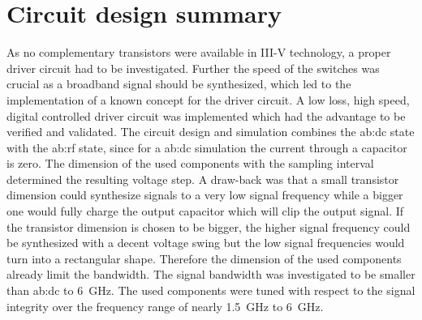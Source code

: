 \section{Circuit design summary}
As no complementary transistors were available in III-V technology, a proper driver circuit had to be investigated.
Further the speed of the switches was crucial as a broadband signal should be synthesized, which led to the implementation of a known concept \cite{MaksimovicPaper} for the driver circuit.
A low loss, high speed, digital controlled driver circuit was implemented which had the advantage to be verified and validated.
The circuit design and simulation combines the \gls{ab:dc} state with the \gls{ab:rf} state, since for a \gls{ab:dc} simulation the current through a capacitor is zero.
The dimension of the used components with the sampling interval determined the resulting voltage step.
A draw-back was that a small transistor dimension could synthesize signals to a very low signal frequency while a bigger one would fully charge the output capacitor which will clip the output signal.
If the transistor dimension is chosen to be bigger, the higher signal frequency could be synthesized with a decent voltage swing but the low signal frequencies would turn into a rectangular shape. 
Therefore the dimension of the used components already limit the bandwidth.
The signal bandwidth was investigated to be smaller than \gls{ab:dc} to \SI{6}{\GHz}.
The used components were tuned with respect to the signal integrity over the frequency range of nearly \SI{1.5}{\giga \hertz} to \SI{6}{\giga \hertz}. 
